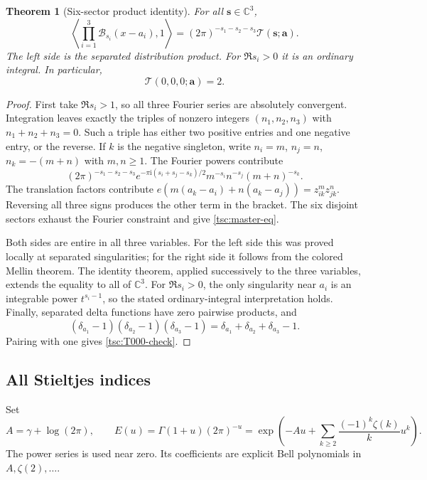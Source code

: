 \documentclass[11pt]{article}
\numberwithin{equation}{section}
\newtheorem{theorem}{Theorem}[section]
\theoremstyle{definition}\newtheorem{definition}[theorem]{Definition}
\theoremstyle{remark}\newtheorem{remark}[theorem]{Remark}
\newcommand{\ii}{\mathrm i}
\newcommand{\CC}{\mathbb C}
\newcommand{\calB}{\mathcal B}
\newcommand{\calT}{\mathcal T}
\begin{document}
\begin{theorem}[Six-sector product identity]\label{tsc:master}
For all $\mathbf s\in\CC^3$,
\begin{equation}\label{tsc:master-eq}
 \left\langle\prod_{i=1}^3\calB_{s_i}(x-a_i),1\right\rangle
       =(2\pi)^{-s_1-s_2-s_3}\calT(\mathbf s;\mathbf a).
\end{equation}
The left side is the separated distribution product. For $\Re s_i>0$
it is an ordinary integral. In particular,
\begin{equation}\label{tsc:T000-check}
 \calT(0,0,0;\mathbf a)=2.
\end{equation}
\end{theorem}
\begin{proof}
First take $\Re s_i>1$, so all three Fourier series are absolutely
convergent. Integration leaves exactly the triples of nonzero integers
$(n_1,n_2,n_3)$ with $n_1+n_2+n_3=0$. Such a triple has either two
positive entries and one negative entry, or the reverse. If $k$ is the
negative singleton, write $n_i=m$, $n_j=n$, $n_k=-(m+n)$ with $m,n\ge1$.
The Fourier powers contribute
\[
 (2\pi)^{-s_1-s_2-s_3}
   e^{-\pi\ii(s_i+s_j-s_k)/2}
          m^{-s_i}n^{-s_j}(m+n)^{-s_k}.
\]
The translation factors contribute
$e(m(a_k-a_i)+n(a_k-a_j))=z_{ik}^m z_{jk}^n$.
Reversing all three signs produces the other term in the bracket. The
six disjoint sectors exhaust the Fourier constraint and give
\eqref{tsc:master-eq}.

Both sides are entire in all three variables. For the left side this was
proved locally at separated singularities; for the right side it follows
from the colored Mellin theorem. The identity theorem, applied successively
to the three variables, extends the equality to all of $\CC^3$.
For $\Re s_i>0$, the only singularity near $a_i$ is an integrable
power $t^{s_i-1}$, so the stated ordinary-integral interpretation holds.
Finally, separated delta functions have zero pairwise products, and
\[
 (\delta_{a_1}-1)(\delta_{a_2}-1)(\delta_{a_3}-1)
    =\delta_{a_1}+\delta_{a_2}+\delta_{a_3}-1.
\]
Pairing with one gives \eqref{tsc:T000-check}.
\end{proof}

\subsection{All Stieltjes indices}
Set
\begin{equation}\label{tsc:E}
 A=\gamma+\log(2\pi),\qquad
 E(u)=\Gamma(1+u)(2\pi)^{-u}
 =\exp\left(-Au+\sum_{k\ge2}\frac{(-1)^k\zeta(k)}k u^k\right).
\end{equation}
The power series is used near zero. Its coefficients are explicit Bell
polynomials in $A,\zeta(2),\ldots$.
\end{document}
